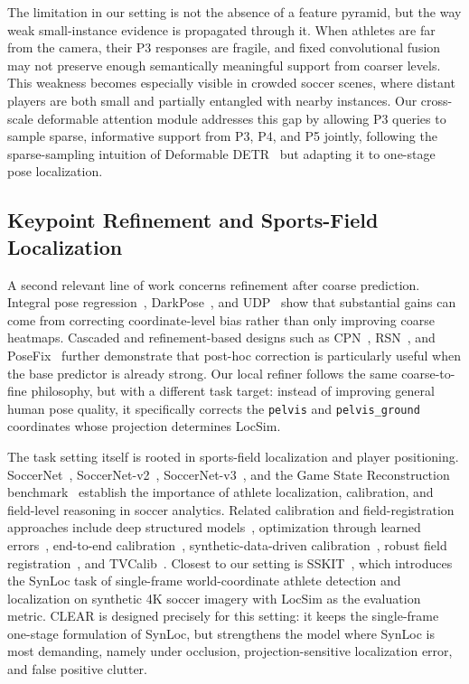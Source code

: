 The limitation in our setting is not the absence of a feature pyramid, but the way weak small-instance evidence is propagated through it. When athletes are far from the camera, their P3 responses are fragile, and fixed convolutional fusion may not preserve enough semantically meaningful support from coarser levels. This weakness becomes especially visible in crowded soccer scenes, where distant players are both small and partially entangled with nearby instances. Our cross-scale deformable attention module addresses this gap by allowing P3 queries to sample sparse, informative support from P3, P4, and P5 jointly, following the sparse-sampling intuition of Deformable DETR~\cite{zhu2021deformable} but adapting it to one-stage pose localization.

\subsection{Keypoint Refinement and Sports-Field Localization}
\label{subsec:sports}

A second relevant line of work concerns refinement after coarse prediction. Integral pose regression~\cite{sun2018integral}, DarkPose~\cite{zhang2020distribution}, and UDP~\cite{huang2020devil} show that substantial gains can come from correcting coordinate-level bias rather than only improving coarse heatmaps. Cascaded and refinement-based designs such as CPN~\cite{chen2018cascaded}, RSN~\cite{cai2020learning}, and PoseFix~\cite{moon2019posefix} further demonstrate that post-hoc correction is particularly useful when the base predictor is already strong. Our local refiner follows the same coarse-to-fine philosophy, but with a different task target: instead of improving general human pose quality, it specifically corrects the \texttt{pelvis} and \texttt{pelvis\_ground} coordinates whose projection determines LocSim.

The task setting itself is rooted in sports-field localization and player positioning. SoccerNet~\cite{giancola2018soccernet}, SoccerNet-v2~\cite{deliege2021soccernetv2}, SoccerNet-v3~\cite{cioppa2022scaling}, and the Game State Reconstruction benchmark~\cite{somers2024soccernet} establish the importance of athlete localization, calibration, and field-level reasoning in soccer analytics. Related calibration and field-registration approaches include deep structured models~\cite{homayounfar2017sports}, optimization through learned errors~\cite{jiang2020optimizing}, end-to-end calibration~\cite{sha2020end2end}, synthetic-data-driven calibration~\cite{chen2019sports}, robust field registration~\cite{nie2021robust}, and TVCalib~\cite{theiner2023tvcalib}. Closest to our setting is SSKIT~\cite{ardo2025}, which introduces the SynLoc task of single-frame world-coordinate athlete detection and localization on synthetic 4K soccer imagery with LocSim as the evaluation metric. CLEAR is designed precisely for this setting: it keeps the single-frame one-stage formulation of SynLoc, but strengthens the model where SynLoc is most demanding, namely under occlusion, projection-sensitive localization error, and false positive clutter.
